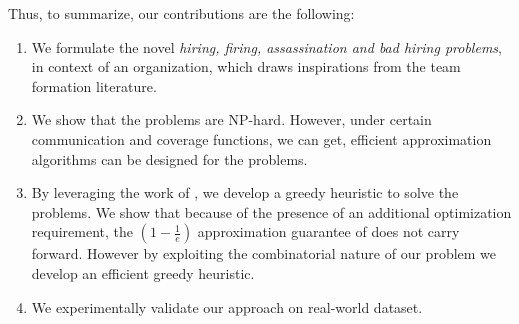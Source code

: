 Thus, to summarize, our contributions are the following:

\begin{enumerate}
\item We formulate the novel \textit{hiring, firing, assassination and bad hiring problems}, in context of an organization, which draws inspirations from the team formation literature.

\item We show that the problems are NP-hard. However, under certain communication and coverage functions, we can get, efficient approximation algorithms can be designed for the problems.

\item By leveraging the work of \cite{bai2016algorithms}, we develop a greedy heuristic to solve the problems. We show that because of the presence of an additional optimization requirement, the $(1 - \frac{1}{e})$ approximation guarantee of \cite{bai2016algorithms} does not carry forward. However by exploiting the combinatorial nature of our problem we develop an efficient greedy heuristic.

\item We experimentally validate our approach on real-world dataset. 

\end{enumerate}